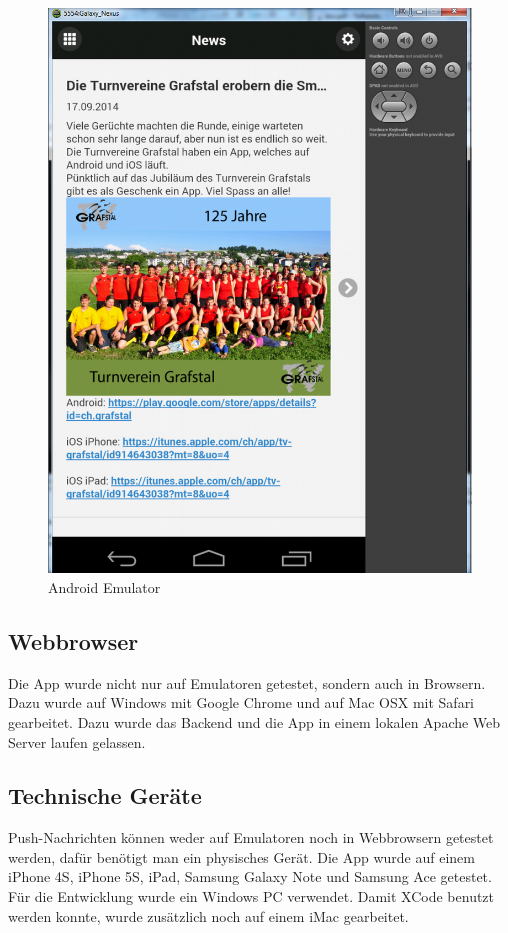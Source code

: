 \begin{figure}[h]
\centering
\includegraphics[scale=0.25]{images/android_emulator.png}
\caption{Android Emulator}
\label{fig:android_emulator}
\end{figure}

\FloatBarrier
\subsection{Webbrowser}
Die App wurde nicht nur auf Emulatoren getestet, sondern auch in Browsern. Dazu wurde auf Windows mit Google Chrome und auf Mac OSX mit Safari gearbeitet. Dazu wurde das Backend und die App in einem lokalen Apache Web Server laufen gelassen.

\subsection{Technische Geräte}
Push-Nachrichten können weder auf Emulatoren noch in Webbrowsern getestet werden, dafür benötigt man ein physisches Gerät. Die App wurde auf einem iPhone 4S, iPhone 5S, iPad, Samsung Galaxy Note und Samsung Ace getestet. Für die Entwicklung wurde ein Windows PC verwendet. Damit XCode benutzt werden konnte, wurde zusätzlich noch auf einem iMac gearbeitet.

